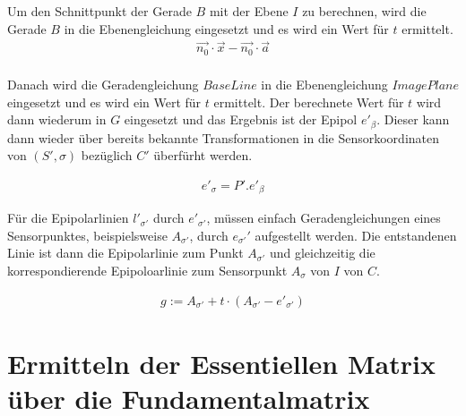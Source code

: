 %
Um den Schnittpunkt der Gerade $B$ mit der Ebene $I$ zu berechnen, wird die Gerade $B$ in die Ebenengleichung eingesetzt und es wird ein Wert für $t$ ermittelt. 
\begin{gather}
\vec{n_0}\cdot \vec{x} - \vec{n_0}\cdot \vec{a}\\
\end{gather}

Danach wird die Geradengleichung \ensuremath{BaseLine} in die Ebenengleichung \ensuremath{ImagePlane} eingesetzt und es wird ein Wert für \ensuremath{t} ermittelt. Der berechnete Wert für $t$ wird dann wiederum in $G$ eingesetzt und das Ergebnis ist der Epipol \ensuremath{e'_\beta}. Dieser kann dann wieder über bereits bekannte Transformationen in die Sensorkoordinaten von $(S',\sigma)$ bezüglich $C'$ überfürht werden.

\begin{gather}
e'_\sigma=P'.e'_\beta
\end{gather}

Für die Epipolarlinien $l'_{\sigma'}$ durch $e'_{\sigma'}$, müssen einfach Geradengleichungen eines Sensorpunktes, beispielsweise $A_{\sigma'}$, durch $e_{\sigma'}'$ aufgestellt werden. Die entstandenen Linie ist dann die Epipolarlinie zum Punkt $A_{\sigma'}$ und gleichzeitig die korrespondierende Epipoloarlinie zum Sensorpunkt $A_\sigma$ von $I$ von $C$.

\begin{gather}
	g:= A_{\sigma'} +t \cdot (A_{\sigma'}-e'_{\sigma'})
\end{gather}

\section{Ermitteln der Essentiellen Matrix über die Fundamentalmatrix}


